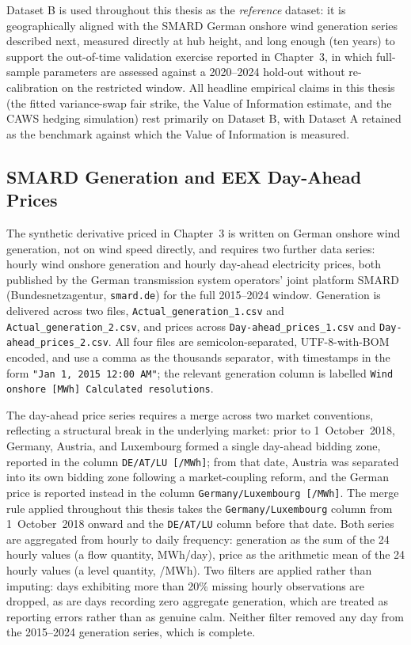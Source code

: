 ﻿\documentclass[11pt, a4paper, twoside]{article}
\begin{document}
Dataset B is used throughout this thesis as the \emph{reference} dataset: it is geographically aligned with the SMARD German onshore wind generation series described next, measured directly at hub height, and long enough (ten years) to support the out-of-time validation exercise reported in Chapter~3, in which full-sample parameters are assessed against a 2020--2024 hold-out without re-calibration on the restricted window. All headline empirical claims in this thesis (the fitted variance-swap fair strike, the Value of Information estimate, and the CAWS hedging simulation) rest primarily on Dataset B, with Dataset A retained as the benchmark against which the Value of Information is measured.

\subsection{SMARD Generation and EEX Day-Ahead Prices}
\label{sec:data-smard}

The synthetic derivative priced in Chapter~3 is written on German onshore wind generation, not on wind speed directly, and requires two further data series: hourly wind onshore generation and hourly day-ahead electricity prices, both published by the German transmission system operators' joint platform SMARD (Bundesnetzagentur, \texttt{smard.de}) for the full 2015--2024 window. Generation is delivered across two files, \texttt{Actual\_generation\_1.csv} and \texttt{Actual\_generation\_2.csv}, and prices across \texttt{Day-ahead\_prices\_1.csv} and \texttt{Day-ahead\_prices\_2.csv}. All four files are semicolon-separated, UTF-8-with-BOM encoded, and use a comma as the thousands separator, with timestamps in the form \texttt{"Jan~1,~2015~12:00~AM"}; the relevant generation column is labelled \texttt{Wind onshore [MWh] Calculated resolutions}.

The day-ahead price series requires a merge across two market conventions, reflecting a structural break in the underlying market: prior to 1~October~2018, Germany, Austria, and Luxembourg formed a single day-ahead bidding zone, reported in the column \texttt{DE/AT/LU~[\texteuro{}/MWh]}; from that date, Austria was separated into its own bidding zone following a market-coupling reform, and the German price is reported instead in the column \texttt{Germany/Luxembourg~[\texteuro{}/MWh]}. The merge rule applied throughout this thesis takes the \texttt{Germany/Luxembourg} column from 1~October~2018 onward and the \texttt{DE/AT/LU} column before that date. Both series are aggregated from hourly to daily frequency: generation as the sum of the 24 hourly values (a flow quantity, MWh/day), price as the arithmetic mean of the 24 hourly values (a level quantity, \texteuro{}/MWh). Two filters are applied rather than imputing: days exhibiting more than 20\% missing hourly observations are dropped, as are days recording zero aggregate generation, which are treated as reporting errors rather than as genuine calm. Neither filter removed any day from the 2015--2024 generation series, which is complete.
\end{document}
